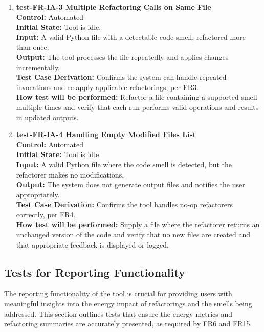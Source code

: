 \documentclass[12pt, titlepage]{article}
\begin{document}
\begin{enumerate}
  \item \textbf{test-FR-IA-3 Multiple Refactoring Calls on Same File} \\[2mm]
    \textbf{Control:} Automated \\
    \textbf{Initial State:} Tool is idle. \\
    \textbf{Input:} A valid Python file with a detectable code smell, refactored more than once. \\
    \textbf{Output:} The tool processes the file repeatedly and applies changes incrementally. \\
    \textbf{Test Case Derivation:} Confirms the system can handle repeated invocations and re-apply applicable refactorings, per FR3. \\
    \textbf{How test will be performed:} Refactor a file containing a supported smell multiple times and verify that each run performs valid operations and results in updated outputs.

  \item \textbf{test-FR-IA-4 Handling Empty Modified Files List} \\[2mm]
    \textbf{Control:} Automated \\
    \textbf{Initial State:} Tool is idle. \\
    \textbf{Input:} A valid Python file where the code smell is detected, but the refactorer makes no modifications. \\
    \textbf{Output:} The system does not generate output files and notifies the user appropriately. \\
    \textbf{Test Case Derivation:} Confirms the tool handles no-op refactorers correctly, per FR4. \\
    \textbf{How test will be performed:} Supply a file where the refactorer returns an unchanged version of the code and verify that no new files are created and that appropriate feedback is displayed or logged.
\end{enumerate}

\subsection{Tests for Reporting Functionality}

The reporting functionality of the tool is crucial for providing users with meaningful insights into the energy impact of refactorings and the smells being addressed. This section outlines tests that ensure the energy metrics and refactoring summaries are accurately presented, as required by FR6 and FR15.
\end{document}
